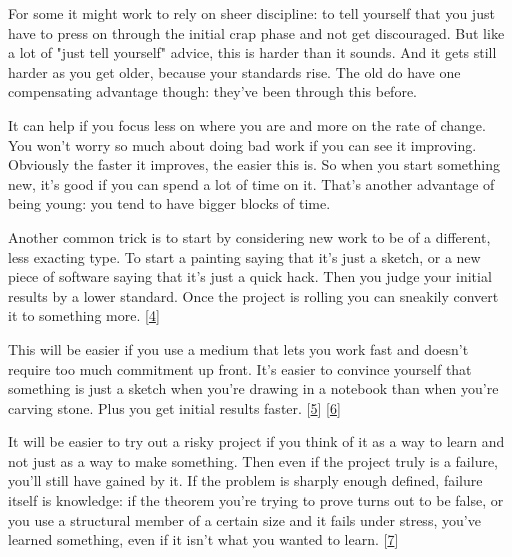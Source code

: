 For some it might work to rely on sheer
                  discipline: to tell yourself that you just have to press on
                  through the initial crap phase and not get discouraged. But
                  like a lot of "just tell yourself" advice, this is harder than
                  it sounds. And it gets still harder as you get older, because
                  your standards rise. The old do have one compensating
                  advantage though: they've been through this before.

It
                  can help if you focus less on where you are and more on the
                  rate of change. You won't worry so much about doing bad work
                  if you can see it improving. Obviously the faster it improves,
                  the easier this is. So when you start something new, it's good
                  if you can spend a lot of time on it. That's another advantage
                  of being young: you tend to have bigger blocks of time.

Another
                  common trick is to start by considering new work to be of a
                  different, less exacting type. To start a painting saying that
                  it's just a sketch, or a new piece of software saying that
                  it's just a quick hack. Then you judge your initial results by
                  a lower standard. Once the project is rolling you can sneakily
                  convert it to something more.
                  [\href{\#f4n}{4}]

This will be easier if you use a medium that lets
                  you work fast and doesn't require too much commitment up
                  front. It's easier to convince yourself that something is just
                  a sketch when you're drawing in a notebook than when you're
                  carving stone. Plus you get initial results faster.
                  [\href{\#f5n}{5}]
                  [\href{\#f6n}{6}]

It will be easier to try out a risky project if
                  you think of it as a way to learn and not just as a way to
                  make something. Then even if the project truly is a failure,
                  you'll still have gained by it. If the problem is sharply
                  enough defined, failure itself is knowledge: if the theorem
                  you're trying to prove turns out to be false, or you use a
                  structural member of a certain size and it fails under stress,
                  you've learned something, even if it isn't what you wanted to
                  learn.
                  [\href{\#f7n}{7}]


